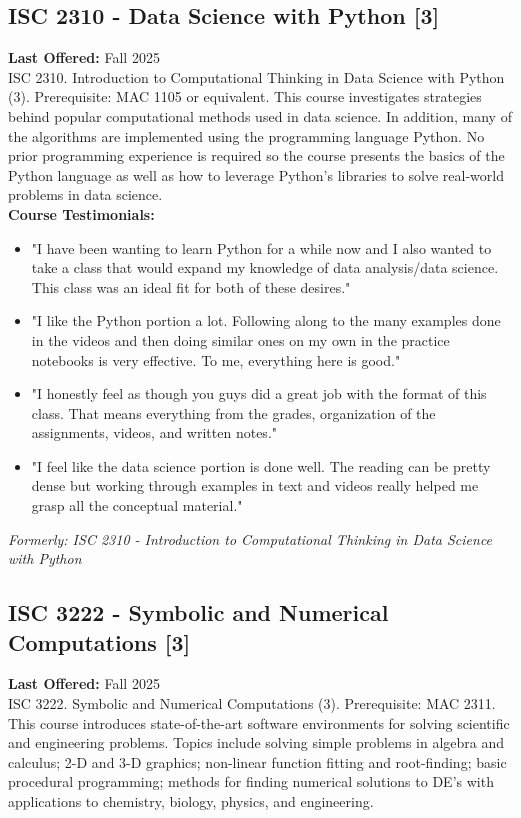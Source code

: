 \documentclass[12pt,a4paper]{article}
\begin{document}
\subsection{ISC 2310 - Data Science with Python [3]}
\textbf{Last Offered:} Fall 2025 \\
ISC 2310. Introduction to Computational Thinking in Data Science with Python (3). Prerequisite: MAC 1105 or equivalent. This course investigates strategies behind popular computational methods used in data science. In addition, many of the algorithms are implemented using the programming language Python. No prior programming experience is required so the course presents the basics of the Python language as well as how to leverage Python's libraries to solve real-world problems in data science. \\
\textbf{Course Testimonials:}
\begin{itemize}
    \item "I have been wanting to learn Python for a while now and I also wanted to take a class that would expand my knowledge of data analysis/data science. This class was an ideal fit for both of these desires."
    \item "I like the Python portion a lot. Following along to the many examples done in the videos and then doing similar ones on my own in the practice notebooks is very effective. To me, everything here is good."
    \item "I honestly feel as though you guys did a great job with the format of this class. That means everything from the grades, organization of the assignments, videos, and written notes."
    \item "I feel like the data science portion is done well. The reading can be pretty dense but working through examples in text and videos really helped me grasp all the conceptual material."
\end{itemize}
\textit{Formerly: ISC 2310 - Introduction to Computational Thinking in Data Science with Python}

\subsection{ISC 3222 - Symbolic and Numerical Computations [3]}
\textbf{Last Offered:} Fall 2025 \\
ISC 3222. Symbolic and Numerical Computations (3). Prerequisite: MAC 2311. This course introduces state-of-the-art software environments for solving scientific and engineering problems. Topics include solving simple problems in algebra and calculus; 2-D and 3-D graphics; non-linear function fitting and root-finding; basic procedural programming; methods for finding numerical solutions to DE's with applications to chemistry, biology, physics, and engineering.
\end{document}
